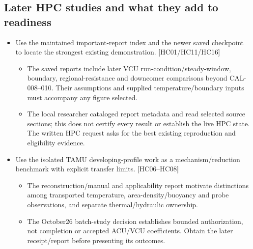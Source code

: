 \subsection{Later HPC studies and what they add to readiness}
\begin{itemize}[leftmargin=*]
\item Use the maintained important-report index and the newer saved checkpoint to locate the strongest existing demonstration. [HC01/HC11/HC16]
\begin{itemize}
\item The saved reports include later VCU run-condition/steady-window, boundary, regional-resistance and downcomer comparisons beyond CAL-008--010. Their assumptions and supplied temperature/boundary inputs must accompany any figure selected.
\item The local researcher cataloged report metadata and read selected source sections; this does not certify every result or establish the live HPC state. The written HPC request asks for the best existing reproduction and eligibility evidence.
\end{itemize}
\item Use the isolated TAMU developing-profile work as a mechanism/reduction benchmark with explicit transfer limits. [HC06--HC08]
\begin{itemize}
\item The reconstruction/manual and applicability report motivate distinctions among transported temperature, area-density/buoyancy and probe observations, and separate thermal/hydraulic ownership.
\item The October26 batch-study decision establishes bounded authorization, not completion or accepted ACU/VCU coefficients. Obtain the later receipt/report before presenting its outcomes.
\end{itemize}
\end{itemize}
